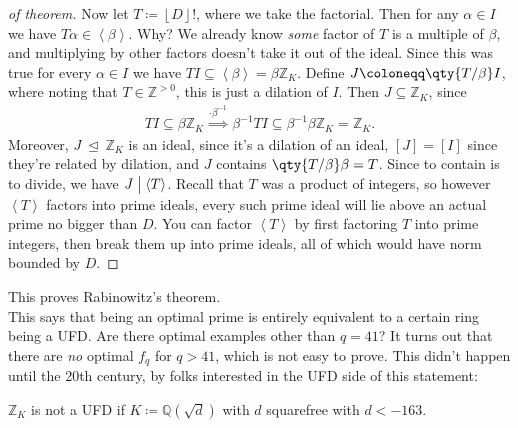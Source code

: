 \begin{proof}[of theorem]
Now let \(T \coloneqq{\left\lfloor D \right\rfloor} !\), where we take
the factorial. Then for any \(\alpha\in I\) we have
\(T \alpha \in \left\langle{ \beta }\right\rangle\). Why? We already
know \emph{some} factor of \(T\) is a multiple of \(\beta\), and
multiplying by other factors doesn't take it out of the ideal. Since
this was true for every \(\alpha\in I\) we have
\(TI \subseteq \left\langle{ \beta }\right\rangle = \beta{\mathbb{Z}}_K\).
Define \(J \coloneqq\qty{T/ \beta} I\), where noting that
\(T\in {\mathbb{Z}}^{> 0}\), this is just a dilation of \(I\). Then
\(J \subseteq {\mathbb{Z}}_K\), since
\begin{align*}
TI \subseteq \beta{\mathbb{Z}}_K \overset{\cdot \beta^{-1}}{\implies } \beta^{-1}T I \subseteq \beta^{-1}\beta {\mathbb{Z}}_K = {\mathbb{Z}}_K
.\end{align*}
Moreover, \(J {~\trianglelefteq~}{\mathbb{Z}}_K\) is an ideal, since
it's a dilation of an ideal, \([J] = [I]\) since they're related by
dilation, and \(J\) contains \(\qty{T / \beta } \beta = T\). Since to
contain is to divide, we have
\(J \bigm|\left\langle{ T }\right\rangle\). Recall that \(T\) was a
product of integers, so however \(\left\langle{ T }\right\rangle\)
factors into prime ideals, every such prime ideal will lie above an
actual prime no bigger than \(D\). You can factor
\(\left\langle{ T }\right\rangle\) by first factoring \(T\) into prime
integers, then break them up into prime ideals, all of which would have
norm bounded by \(D\).

\end{proof}

\begin{remark}

\end{remark}

\begin{remark}

This proves Rabinowitz's theorem.\\

This says that being an optimal prime is entirely equivalent to a
certain ring being a UFD. Are there optimal examples other than
\(q=41\)? It turns out that there are \emph{no} optimal \(f_q\) for
\(q>41\), which is not easy to prove. This didn't happen until the 20th
century, by folks interested in the UFD side of this statement:

\end{remark}

\begin{theorem}

\({\mathbb{Z}}_K\) is not a UFD if
\(K \coloneqq{\mathbb{Q}}( \sqrt{d} )\) with \(d\) squarefree with
\(d<-163\).

\end{theorem}

